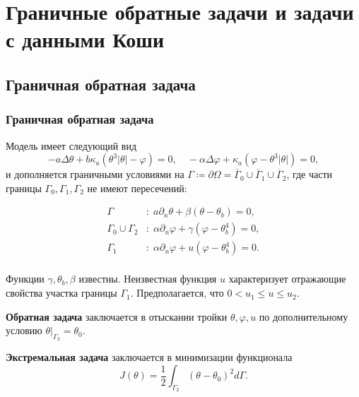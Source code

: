 \section{Граничные обратные задачи и задачи с данными Коши}\label{sec:rev}

\subsection{Граничная обратная задача}\label{subsec:rev}
\begin{frame}
    \frametitle{Граничная обратная задача}
    Модель имеет следующий вид
    \begin{equation}
        \label{eq:2_1:initial}
        - a \Delta \theta + b \kappa_a(\theta ^ 3 | \theta | - \varphi) = 0,  \quad
        - \alpha \Delta \varphi + \kappa_a (\varphi - \theta ^3 | \theta |) = 0,
    \end{equation}
    и дополняется граничными условиями на
    $\Gamma \coloneqq \partial \Omega =\overline{\Gamma}_0 \cup \overline{\Gamma}_1 \cup \overline{\Gamma}_2$,
    где части границы $\Gamma_0, \Gamma_1, \Gamma_2$ не имеют пересечений:

    \begin{equation}
        \label{eq:2_1:initial-boundary}
        \begin{aligned}
            \Gamma &: \; a \partial_n \theta + \beta (\theta - \theta _b) = 0, \\
            \Gamma_0 \cup \Gamma_2 &: \; \alpha \partial_n \varphi
            + \gamma(\varphi - \theta_b ^4 ) = 0, \\
            \Gamma_1 &: \; \alpha \partial_n \varphi + u(\varphi - \theta_b ^4 ) = 0. \\
        \end{aligned}
    \end{equation}

    Функции $\gamma, \theta_b, \beta$ известны.
    Неизвестная функция $u$ характеризует отражающие свойства участка границы $\Gamma_1$.
    Предполагается, что $0 < u_1 \leq u \leq u_2$.

    \textbf{Обратная задача} заключается в отыскании тройки $\theta, \varphi, u$
    по дополнительному условию $\theta|_{\Gamma_2} = \theta_0$.

    \textbf{Экстремальная задача} заключается в минимизации функционала
    \[ J(\theta) = \frac{1}{2} \int_{\Gamma_2} (\theta - \theta_0)^2 d\Gamma. \]
\end{frame}


